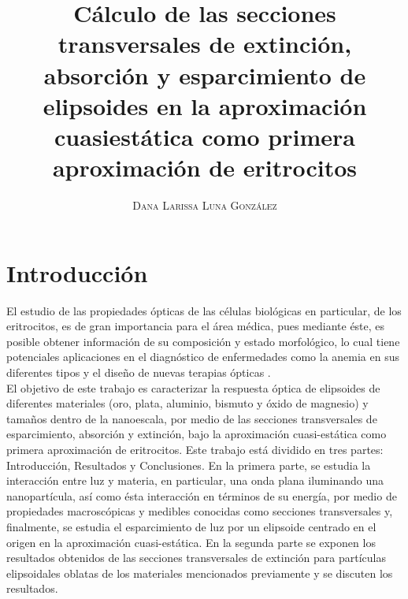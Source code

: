 \documentclass[paper=letter,8.5pt]{article}
\title{\vspace{-15mm}\fontsize{17pt}\selectfont\textbf{Cálculo de las secciones transversales de extinción, absorción y esparcimiento de elipsoides en la aproximación cuasiestática como primera aproximación de eritrocitos }} %
\author{
\large
{\textsc{ Dana Larissa Luna González}}\\[2mm]}
\date{}
\begin{document}
\maketitle %
\thispagestyle{fancy} %
\section{Introducción}
El estudio de las propiedades ópticas de las células biológicas en particular, de los eritrocitos, es de gran importancia para el área médica, pues mediante éste, es posible obtener información de su composición y estado morfológico, lo cual tiene potenciales aplicaciones en el diagnóstico de enfermedades como la anemia en sus diferentes tipos y el diseño de nuevas terapias ópticas \cite{Blood}. \\

El objetivo de este trabajo es caracterizar la respuesta óptica de elipsoides de diferentes materiales (oro, plata, aluminio, bismuto y óxido de magnesio) y tamaños dentro de la nanoescala, por medio de las secciones transversales de esparcimiento, absorción y extinción, bajo la aproximación cuasi-estática como primera aproximación de eritrocitos. Este trabajo está dividido en tres partes: Introducción, Resultados y Conclusiones. En la primera parte, se estudia la interacción entre luz y materia, en particular, una onda plana iluminando una nanopartícula, así como ésta interacción en términos de su energía, por medio de propiedades macroscópicas y medibles conocidas como secciones transversales y, finalmente, se estudia el esparcimiento de luz por un elipsoide centrado en el origen en la aproximación cuasi-estática. En la segunda parte se exponen los resultados obtenidos de las secciones transversales de extinción para partículas elipsoidales oblatas de los materiales mencionados previamente y se discuten los resultados. \\









\end{document}
